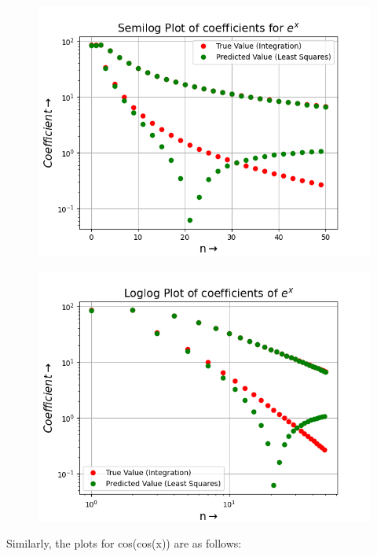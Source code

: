 \documentclass{article}
\begin{document}
\begin{figure}[h!]
    \centering
    \includegraphics[scale=0.55]{q5(a)}
    \label{fig:1(b)}
\end{figure}
\begin{figure}[h!]
    \centering
    \includegraphics[scale=0.55]{q5(b)}
    \label{fig:1(b)}
\end{figure}

\newpage
Similarly, the plots for cos(cos(x)) are as follows:
\end{document}
